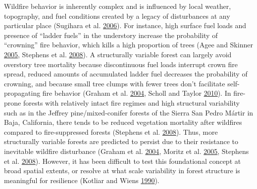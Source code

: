 \documentclass[twoside,12pt,final]{ucthesis-CA2012}
\begin{document}
\begin{ucmainmatter}
Wildfire behavior is inherently complex and is influenced by local
weather, topography, and fuel conditions created by a legacy of
disturbances at any particular place (Sugihara et al.
\protect\hyperlink{ref-sugihara2006}{2006}). For instance, high surface
fuel loads and presence of ``ladder fuels'' in the understory increase
the probability of ``crowning'' fire behavior, which kills a high
proportion of trees (Agee and Skinner
\protect\hyperlink{ref-agee2005}{2005}, Stephens et al.
\protect\hyperlink{ref-stephens2008}{2008}). A structurally variable
forest can largely avoid overstory tree mortality because discontinuous
fuel loads interrupt crown fire spread, reduced amounts of accumulated
ladder fuel decreases the probability of crowning, and because small
tree clumps with fewer trees don't facilitate self-propagating fire
behavior (Graham et al. \protect\hyperlink{ref-graham2004}{2004}, Scholl
and Taylor \protect\hyperlink{ref-scholl2010}{2010}). In fire-prone
forests with relatively intact fire regimes and high structural
variability such as in the Jeffrey pine/mixed-conifer forests of the
Sierra San Pedro Mártir in Baja, California, there tends to be reduced
vegetation mortality after wildfires compared to fire-suppressed forests
(Stephens et al. \protect\hyperlink{ref-stephens2008}{2008}). Thus, more
structurally variable forests are predicted to persist due to their
resistance to inevitable wildfire disturbance (Graham et al.
\protect\hyperlink{ref-graham2004}{2004}, Moritz et al.
\protect\hyperlink{ref-moritz2005}{2005}, Stephens et al.
\protect\hyperlink{ref-stephens2008}{2008}). However, it has been
difficult to test this foundational concept at broad spatial extents, or
resolve at what scale variability in forest structure is meaningful for
resilience (Kotliar and Wiens
\protect\hyperlink{ref-kotliar1990}{1990}).


\end{ucmainmatter}
\end{document}
